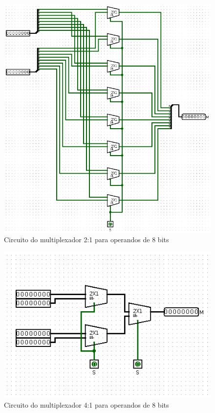 \documentclass[
	12pt,				%
	openright,			%
	twoside,			%
	a4paper,			%
	english,			%
	french,				%
	spanish,			%
	brazil,				%
	]{abntex2}
\begin{document}
\begin{figure}[H]
	\begin{center}
	    \includegraphics[scale=0.5]{mux218.png}
	\end{center}
\caption{\label{mux218}Circuito do multiplexador 2:1 para operandos de 8 bits}
\end{figure}

\begin{figure}[H]
	\begin{center}
	    \includegraphics[scale=0.6]{mux418.png}
	\end{center}
\caption{\label{mux418}Circuito do multiplexador 4:1 para operandos de 8 bits}
\end{figure}
\end{document}
